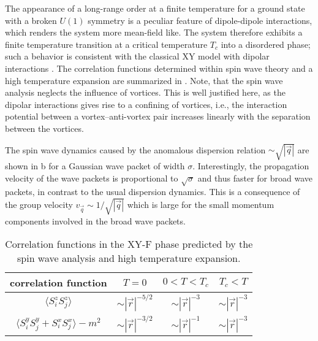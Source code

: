 The appearance of a long-range order at a finite temperature for a ground state with a broken $U(1)$ symmetry is
a peculiar feature of dipole-dipole interactions, which renders the system more mean-field like. The system therefore
exhibits a finite temperature transition at a critical temperature $T_{c}$ into a disordered phase; such a behavior is
consistent with the classical XY model with dipolar interactions \cite{Bruno2001}. The correlation functions determined
within spin wave theory and a high temperature expansion are summarized in .
 Note, that the spin wave analysis neglects the influence of vortices. This is well justified here,
as the dipolar interactions gives rise to a confining of vortices, i.e., the interaction potential
between a vortex--anti-vortex pair increases linearly with the separation between the vortices.

The spin wave dynamics caused by the anomalous dispersion relation $\sim \sqrt{|{\vec q}|}$ are shown in b for a Gaussian wave packet of width $\sigma$. Interestingly, the propagation velocity of the wave packets is proportional to $\sqrt{\sigma}$ and thus faster for broad wave packets, in contrast to the usual dispersion dynamics. This is a consequence of the group velocity $v_{\vec q} \sim 1/\sqrt{|{\vec q}|}$ which is large for the small momentum components involved in the broad wave packets.

\begin{table}
    \centering
\begin{tabular}{c c c c}
\toprule
 correlation function &  \hspace{10pt} $T=0$    \hspace{10pt}&   \hspace{10pt} $0 < T< T_{c}$    \hspace{10pt}&   \hspace{10pt}$T_{c}< T $    \hspace{10pt}\\
 \hline
$ \langle S^{z}_{i} S^{z}_{j}\rangle$  &$ \sim |{\vec r}|^{-5/2}$  & $\sim |{\vec r}|^{-3}$ &  $\sim |{\vec r}|^{-3}$ \\
$ \langle S^{y}_{i} S^{y}_{j}+ S^{x}_{i} S^{x}_{j}\rangle- m^2$  &$ \sim |{\vec r}|^{-3/2}$ &  $\sim |{\vec r}|^{-1}$ &  $\sim |{\vec r}|^{-3}$
\end{tabular}
\caption{  Correlation functions in the XY-F phase predicted by the spin wave analysis and high temperature expansion. }
\end{table}





